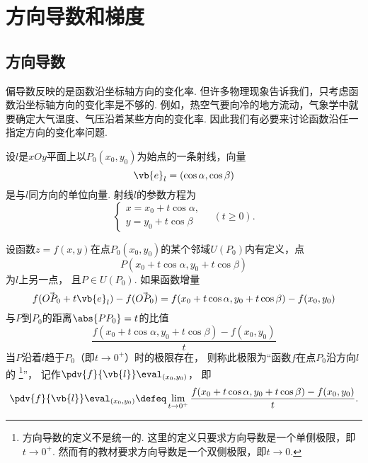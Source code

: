 \section{方向导数和梯度}
\subsection{方向导数}
偏导数反映的是函数沿坐标轴方向的变化率.
但许多物理现象告诉我们，只考虑函数沿坐标轴方向的变化率是不够的.
例如，热空气要向冷的地方流动，气象学中就要确定大气温度、气压沿着某些方向的变化率.
因此我们有必要来讨论函数沿任一指定方向的变化率问题.

\begin{definition}
设\(l\)是\(xOy\)平面上以\(P_0(x_0,y_0)\)为始点的一条射线，向量\begin{equation*}
	\vb{e}_l=(\cos\alpha,\cos\beta)
\end{equation*}是与\(l\)同方向的单位向量.
射线\(l\)的参数方程为\begin{equation*}
	\left\{ \begin{array}{l}
		x=x_0+t\cos\alpha, \\
		y=y_0+t\cos\beta
	\end{array} \right.
	\quad(t \geq 0).
\end{equation*}

设函数\(z=f(x,y)\)在点\(P_0(x_0,y_0)\)的某个邻域\(U(P_0)\)内有定义，点\begin{equation*}
	P(x_0+t\cos\alpha,y_0+t\cos\beta)
\end{equation*}为\(l\)上另一点，
且\(P \in U(P_0)\).
如果函数增量\begin{equation*}
	f(\vec{O P_0} + t \vb{e}_l) - f(\vec{O P_0})
	= f(x_0+t\cos\alpha,y_0+t\cos\beta)-f(x_0,y_0)
\end{equation*}与\(P\)到\(P_0\)的距离\(\abs{PP_0}=t\)的比值\begin{equation*}
	\frac{f(x_0+t\cos\alpha,y_0+t\cos\beta)-f(x_0,y_0)}{t}
\end{equation*}当\(P\)沿着\(l\)趋于\(P_0\)（即\(t\to0^+\)）时的极限存在，
则称此极限为“函数\(f\)在点\(P_0\)沿方向\(l\)的%
\footnote{方向导数的定义不是统一的.
这里的定义只要求方向导数是一个单侧极限，即\(t\to0^+\).
然而有的教材要求方向导数是一个双侧极限，即\(t\to0\).}”，
记作\(\pdv{f}{\vb{l}}\eval_{(x_0,y_0)}\)，
即\begin{equation*}
	\pdv{f}{\vb{l}}\eval_{(x_0,y_0)}
	\defeq
	\lim_{t\to0^+} \frac{f(x_0+t\cos\alpha,y_0+t\cos\beta)-f(x_0,y_0)}{t}.
\end{equation*}
\end{definition}

